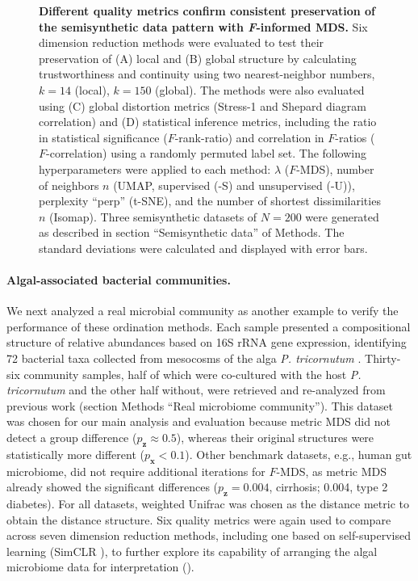 \documentclass[10pt,letterpaper]{article}
\newcommand{\1}{{\rm 1}\kern-0.24em{\rm I}}
\begin{document}
\begin{figure}[h!]
    \centering
    \caption{\textbf{Different quality metrics confirm consistent preservation of the semisynthetic data pattern with \textit{F}-informed MDS.} Six dimension reduction methods were evaluated to test their preservation of (A) local and (B) global structure by calculating trustworthiness and continuity using two nearest-neighbor numbers, $k=14$ (local), $k=150$ (global). The methods were also evaluated using (C) global distortion metrics (Stress-1 and Shepard diagram correlation) and (D) statistical inference metrics, including the ratio in statistical significance ($F$-rank-ratio) and correlation in $F$-ratios ($F$-correlation) using a randomly permuted label set. The following hyperparameters were applied to each method: $\lambda$ ($F$-MDS), number of neighbors $n$ (UMAP, supervised (-S) and unsupervised (-U)), perplexity ``perp'' (t-SNE), and the number of shortest dissimilarities $n$ (Isomap). Three semisynthetic datasets of $N=200$ were generated as described in section ``Semisynthetic data'' of Methods. The standard deviations were calculated and displayed with error bars.}
    \label{fig:eval_simul}
\end{figure}


\paragraph*{Algal-associated bacterial communities.}
We next analyzed a real microbial community as another example to verify the performance of these ordination methods. Each sample presented a compositional structure of relative abundances based on 16S rRNA gene expression, identifying 72 bacterial taxa collected from mesocosms of the alga \textit{P. tricornutum} \cite{Samo18, Kimbrel19}. Thirty-six community samples, half of which were co-cultured with the host \textit{P. tricornutum} and the other half without, were retrieved and re-analyzed from previous work \cite{kim22} (section Methods ``Real microbiome community''). This dataset was chosen for our main analysis and evaluation because metric MDS did not detect a group difference ($p_\mathbf{z}\approx0.5$), whereas their original structures were statistically more different ($p_\mathbf{x}<0.1$). Other benchmark datasets, e.g., human gut microbiome, did not require additional iterations for $F$-MDS, as metric MDS already showed the significant differences ($p_\mathbf{z}= 0.004$, cirrhosis; 0.004, type 2 diabetes). For all datasets, weighted Unifrac \cite{lozupone07} was chosen as the distance metric to obtain the distance structure. Six quality metrics were again used to compare across seven dimension reduction methods, including one based on self-supervised learning (SimCLR \cite{chen20}), to further explore its capability of arranging the algal microbiome data for interpretation (). 
\end{document}
